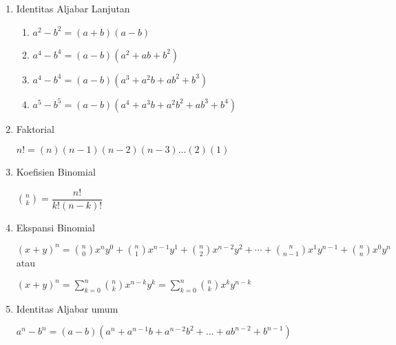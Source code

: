 \documentclass[12pt,a4paper,draft,final,oneside,twoside,openright,openany]{article}
\begin{document}
\begin{enumerate}
\begin{enumerate}
				\end{enumerate}
			\item Identitas Aljabar Lanjutan
				\begin{enumerate}
					\item $a^2-b^2=(a+b)(a-b)$
					\item $a^4-b^4=(a-b)(a^2+ab+b^2)$ 
					\item $a^4-b^4=(a-b)(a^3+a^2b+ab^2+b^3)$
					\item $a^5-b^5=(a-b)(a^4+a^3b+a^2b^2+ab^3+b^4)$
				\end{enumerate}
			\item Faktorial
			\begin{center}
				$n!=(n)(n-1)(n-2)(n-3)...(2)(1)$
			\end{center}
			\item Koefisien Binomial
				\begin{center}
					$\binom {n}{k}=\dfrac {n!}{k!(n-k)!}$
				\end{center}
			\item Ekspansi Binomial
			\begin{center}
				$(x+y)^{n}={n \choose 0}x^{n}y^{0}+{n \choose 1}x^{n-1}y^{1}+{n \choose 2}x^{n-2}y^{2}+\cdots +{n \choose n-1}x^{1}y^{n-1}+{n \choose n}x^{0}y^{n}$\\
				
				atau
				
				$(x+y)^{n}=\sum _{k=0}^{n}{n \choose k}x^{n-k}y^{k}=\sum _{k=0}^{n}{n \choose k}x^{k}y^{n-k}$
			\end{center}
			
			\item Identitas Aljabar umum
			\begin{center}
				$a^n-b^n=(a-b)(a^n+a^{n-1}b+a^{n-2}b^{2}+...+ab^{n-2}+b^{n-1})$
			\end{center}
			
			\begin{center}
				

\end{center}
\end{enumerate}
\end{document}

